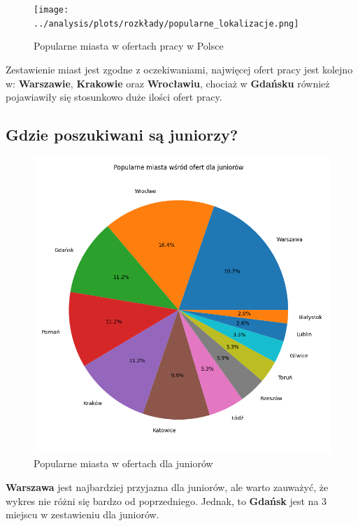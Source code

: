 \documentclass[a4paper]{article}
\begin{document}
\begin{figure}[H]
    \centering
    \texttt{[image: ../analysis/plots/rozkłady/popularne\_lokalizacje.png]}
    \caption{Popularne miasta w ofertach pracy w Polsce}
\end{figure}

\quad Zestawienie miast jest zgodne z oczekiwaniami, najwięcej ofert pracy jest kolejno w: \textbf{Warszawie}, \textbf{Krakowie} oraz \textbf{Wrocławiu}, chociaż w
\textbf{Gdańsku} również pojawiawiły się stosunkowo duże ilości ofert pracy.


\subsection{Gdzie poszukiwani są juniorzy?}

\begin{figure}[H]
    \centering
    \includegraphics[width=\textwidth]{../analysis/plots/rozkłady/popularne_miasta_wśród_ofert_dla_juniorów.png}
    \caption{Popularne miasta w ofertach dla juniorów}
\end{figure}

\quad \textbf{Warszawa} jest najbardziej przyjazna dla juniorów, ale
warto zauważyć, że wykres nie różni się bardzo od poprzedniego. Jednak, to \textbf{Gdańsk} jest na 3 miejscu w zestawieniu dla juniorów.
\end{document}
